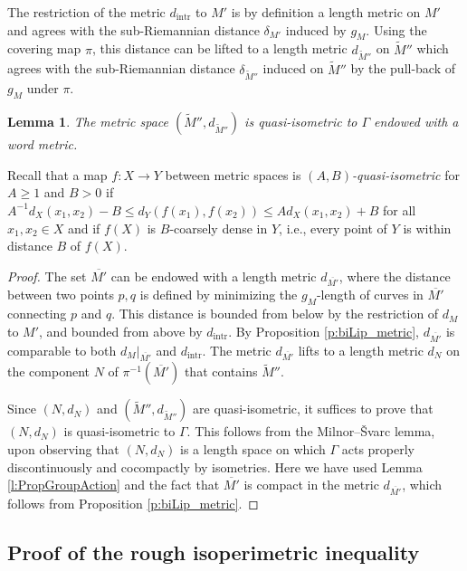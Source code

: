 \documentclass[10pt,letterpaper]{amsart}
\newtheorem{lemma}[thm]{Lemma}
\theoremstyle{definition}
\numberwithin{thm}{subsection}
\numberwithin{equation}{section}
\begin{document}
The restriction of the metric $d_{\mathrm{intr}}$ to $M'$ is by definition a length metric on $M'$ and agrees with the sub-Riemannian distance $\delta_{M'}$ induced by $g_M$. Using the covering map $\pi$, this distance can be lifted to a length metric $d_{\widetilde{M}''}$ on $\widetilde{M}''$ which agrees with the sub-Riemannian distance $\delta_{\widetilde{M}''}$ induced on $\widetilde{M}''$ by the pull-back of $g_M$ under $\pi$.

\begin{lemma}\label{l:GammaQI}
The metric space $(\widetilde{M}'',d_{\widetilde{M}''})$ is quasi-isometric to $\Gamma$ endowed with a word metric.
\end{lemma}

Recall that a map $f:X\to Y$ between metric spaces is {\it $(A,B)$-quasi-isometric} for $A \ge 1$ and $B>0$ if $A^{-1}d_X(x_1,x_2)-B \le d_Y(f(x_1),f(x_2)) \le A d_X(x_1,x_2)+B$ for all $x_1,x_2 \in X$ and if $f(X)$ is $B$-coarsely dense in $Y$, i.e., every point of $Y$ is within distance $B$ of $f(X)$.

\begin{proof}
The set $\overline{M'}$ can be endowed with a length metric $d_{\overline{M'}}$, where the distance between two points $p,q$ is defined by minimizing the $g_M$-length of curves in $\overline{M'}$ connecting $p$ and $q$. This distance is bounded from below by the restriction of $d_M$ to $M'$, and bounded from above by $d_{\mathrm{intr}}$. By Proposition
\ref{p:biLip_metric}, $d_{\overline{M'}}$ is comparable to both $d_M|_{\overline{M'}}$ and $d_{\mathrm{intr}}$. The metric $d_{\overline{M'}}$ lifts to a length metric $d_N$ on the component $N$ of $\pi^{-1}(\overline{M'})$ that contains $\widetilde{M}''$.

Since $(N,d_N)$ and $(\widetilde{M}'',d_{\widetilde{M}''})$ are quasi-isometric, it suffices to prove that $(N,d_N)$ is quasi-isometric to $\Gamma$.
This follows from the Milnor--\v{S}varc lemma, upon observing that $(N,d_N)$ is a length space on which $\Gamma$ acts properly discontinuously and cocompactly by isometries. Here we have used Lemma \ref{l:PropGroupAction} and the fact that $\overline{M'}$ is compact in the metric $d_{\overline{M'}}$, which follows from Proposition \ref{p:biLip_metric}.
\end{proof}

\subsection{Proof of the rough isoperimetric inequality}\label{ss:isop}
\end{document}
